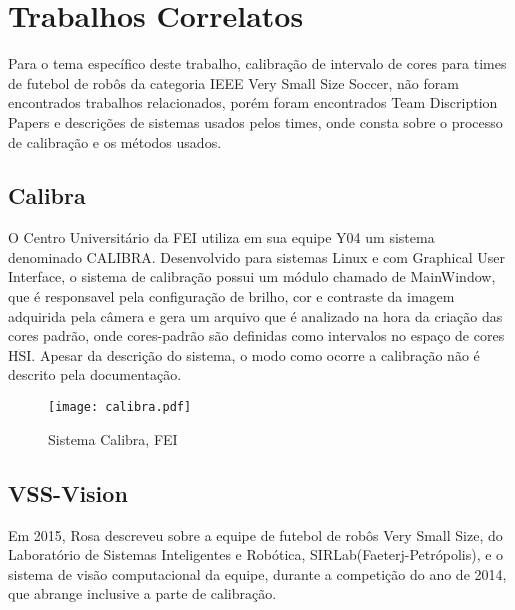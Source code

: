 \section{Trabalhos Correlatos}
Para o tema específico deste trabalho, calibração de intervalo de cores para times de futebol de robôs da categoria IEEE Very Small Size Soccer, não foram encontrados trabalhos relacionados, porém foram encontrados Team Discription Papers e descrições de sistemas usados pelos times, onde consta sobre o processo de calibração e os métodos usados\cite{Penharbel:2004}\cite{Rosa:2015}\cite{VSSVision}\cite{PenharbelTime}.

\subsection{Calibra}
O Centro Universitário da FEI\cite{PenharbelTime} utiliza em sua equipe Y04 um sistema denominado CALIBRA\cite{Penharbel:2004}. Desenvolvido para sistemas Linux e com Graphical User Interface\cite{Penharbel:2004}, o sistema de calibração possui um módulo chamado de MainWindow, que é responsavel pela configuração de brilho, cor e contraste da imagem adquirida pela câmera e gera um arquivo que é analizado na hora da criação das cores padrão\cite{PenharbelTime}, onde cores-padrão são definidas como intervalos no espaço de cores HSI\cite{PenharbelTime}. Apesar da descrição do sistema, o modo como ocorre a calibração não é descrito pela documentação.
\begin{figure}[H]
	\centering
	\texttt{[image: calibra.pdf]}
	\caption{Sistema Calibra, FEI\cite{Penharbel:2004}}
	\label{Calibra}
\end{figure}

\subsection{VSS-Vision}

Em 2015, Rosa\cite{Rosa:2015} descreveu sobre a equipe de futebol de rob\^os Very Small Size, do Laboratório de Sistemas Inteligentes e Robótica, SIRLab(Faeterj-Petrópolis), e o sistema de visão computacional da equipe, durante a competição do ano de 2014, que abrange inclusive a parte de calibração. 

